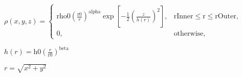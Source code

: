 \documentclass[a4paper,14pt]{extarticle}
\renewenvironment{equation}
{\preview$\displaystyle}
{$\endpreview}
\begin{document}
\begin{equation}\label{disk}
\rho(\mathit{x},\mathit{y},\mathit{z}) = \begin{cases}
               \mathrm{rho0} \left(\frac{\mathrm{r0}}{r}\right)^\mathrm{alpha} \exp\left[-\frac{1}{2}\left(\frac{ \mathit{z}}{h(r)}\right)^2\right],       &  \mathrm{rInner} \le \mathrm{r} \le  \mathrm{rOuter}, \\
               0,& \text{otherwise},          \end{cases}
\end{equation}

\begin{equation}
 h(r)=\mathrm{h0}\left(\frac{r}{\mathrm{r0}}\right)^\mathrm{beta}
\end{equation}

\begin{equation}
 r=\sqrt{\mathit{x}^2+\mathit{y}^2}
\end{equation}
\end{document}

